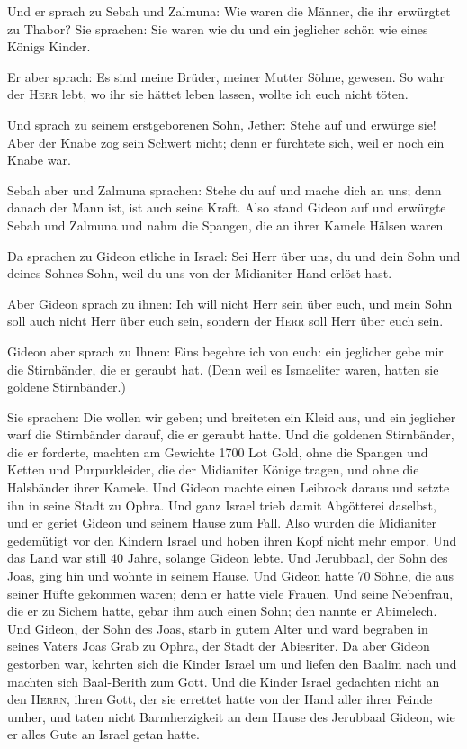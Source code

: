  Und er sprach zu Sebah und Zalmuna: Wie waren die
Männer, die ihr erwürgtet zu Thabor? Sie sprachen: Sie waren wie du und
ein jeglicher schön wie eines Königs Kinder.

 Er aber sprach: Es sind meine Brüder, meiner Mutter
Söhne, gewesen. So wahr der \textsc{Herr} lebt, wo ihr sie hättet leben
lassen, wollte ich euch nicht töten.

 Und sprach zu seinem erstgeborenen Sohn, Jether: Stehe
auf und erwürge sie! Aber der Knabe zog sein Schwert nicht; denn er
fürchtete sich, weil er noch ein Knabe war.

 Sebah aber und Zalmuna sprachen: Stehe du auf und mache
dich an uns; denn danach der Mann ist, ist auch seine Kraft. Also stand
Gideon auf und erwürgte Sebah und Zalmuna und nahm die Spangen, die an
ihrer Kamele Hälsen waren.

 Da sprachen zu Gideon etliche in Israel: Sei Herr über
uns, du und dein Sohn und deines Sohnes Sohn, weil du uns von der
Midianiter Hand erlöst hast.

 Aber Gideon sprach zu ihnen: Ich will nicht Herr sein
über euch, und mein Sohn soll auch nicht Herr über euch sein, sondern
der \textsc{Herr} soll Herr über euch sein.

 Gideon aber sprach zu Ihnen: Eins begehre ich von euch:
ein jeglicher gebe mir die Stirnbänder, die er geraubt hat. (Denn weil
es Ismaeliter waren, hatten sie goldene Stirnbänder.)

 Sie sprachen: Die wollen wir geben; und breiteten ein
Kleid aus, und ein jeglicher warf die Stirnbänder darauf, die er geraubt
hatte.  Und die goldenen Stirnbänder, die er forderte,
machten am Gewichte 1700 Lot Gold, ohne die Spangen und Ketten und
Purpurkleider, die der Midianiter Könige tragen, und ohne die Halsbänder
ihrer Kamele.  Und Gideon machte einen Leibrock daraus
und setzte ihn in seine Stadt zu Ophra. Und ganz Israel trieb damit
Abgötterei daselbst, und er geriet Gideon und seinem Hause zum Fall.
 Also wurden die Midianiter gedemütigt vor den Kindern
Israel und hoben ihren Kopf nicht mehr empor. Und das Land war still 40
Jahre, solange Gideon lebte.  Und Jerubbaal, der Sohn des
Joas, ging hin und wohnte in seinem Hause.  Und Gideon
hatte 70 Söhne, die aus seiner Hüfte gekommen waren; denn er hatte viele
Frauen.  Und seine Nebenfrau, die er zu Sichem hatte,
gebar ihm auch einen Sohn; den nannte er Abimelech.  Und
Gideon, der Sohn des Joas, starb in gutem Alter und ward begraben in
seines Vaters Joas Grab zu Ophra, der Stadt der Abiesriter.
 Da aber Gideon gestorben war, kehrten sich die Kinder
Israel um und liefen den Baalim nach und machten sich Baal-Berith zum
Gott.  Und die Kinder Israel gedachten nicht an den
\textsc{Herrn}, ihren Gott, der sie errettet hatte von der Hand aller
ihrer Feinde umher,  und taten nicht Barmherzigkeit an
dem Hause des Jerubbaal Gideon, wie er alles Gute an Israel getan hatte.


